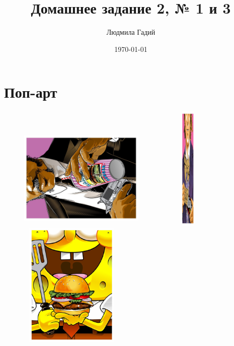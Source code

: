 \documentclass[12pt, a4paper]{article}
\author{Людмила Гадий}
\title{Домашнее задание 2, № 1 и 3}
\date{\today}
\begin{document}
\maketitle

\section{Поп-арт}

\begin{figure}[h!]

\begin{minipage}[h!]{0.3\linewidth}
\includegraphics[height=5cm, width=6cm, angle=270]{pop1.pdf}
\end{minipage}
\hfill
\begin{minipage}[h!]{0.3\linewidth}
\includegraphics[height=6cm, width=5cm]{pop7.pdf}
\end{minipage}
\hfill
\begin{minipage}[h!]{0.3\linewidth}
\includegraphics[height=6cm, width=5cm]{pop8.pdf}

\end{minipage}
\end{figure}
\end{document}
